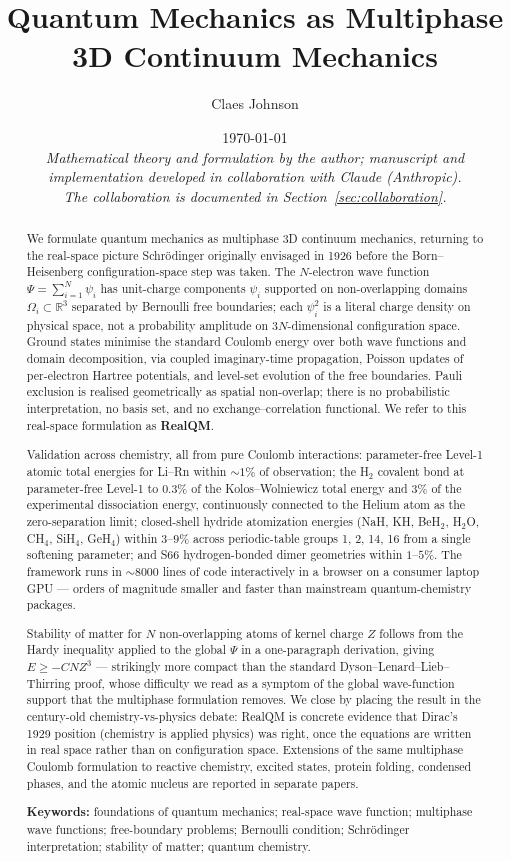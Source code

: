 \documentclass[11pt]{article}
\title{Quantum Mechanics as Multiphase 3D Continuum Mechanics}
\author[1]{Claes Johnson}
\affil[1]{KTH Royal Institute of Technology, Stockholm, Sweden \\
\texttt{claesjohnson@gmail.com}}
\date{\today \\[0.4em]
\small\textit{Mathematical theory and formulation by the author; manuscript and} \\
\small\textit{implementation developed in collaboration with Claude (Anthropic).} \\
\small\textit{The collaboration is documented in Section~\ref{sec:collaboration}.}}
\begin{document}
\maketitle

\begin{abstract}
We formulate quantum mechanics as multiphase 3D continuum mechanics, returning to the real-space picture Schr\"odinger originally envisaged in 1926 before the Born--Heisenberg configuration-space step was taken. The $N$-electron wave function $\Psi = \sum_{i=1}^{N} \psi_i$ has unit-charge components $\psi_i$ supported on non-overlapping domains $\Omega_i \subset \mathbb{R}^3$ separated by Bernoulli free boundaries; each $\psi_i^2$ is a literal charge density on physical space, not a probability amplitude on $3N$-dimensional configuration space. Ground states minimise the standard Coulomb energy over both wave functions and domain decomposition, via coupled imaginary-time propagation, Poisson updates of per-electron Hartree potentials, and level-set evolution of the free boundaries. Pauli exclusion is realised geometrically as spatial non-overlap; there is no probabilistic interpretation, no basis set, and no exchange--correlation functional. We refer to this real-space formulation as \textbf{RealQM}.

Validation across chemistry, all from pure Coulomb interactions: parameter-free Level-1 atomic total energies for Li--Rn within ${\sim}1\%$ of observation; the H$_2$ covalent bond at parameter-free Level-1 to $0.3\%$ of the Kolos--Wolniewicz total energy and $3\%$ of the experimental dissociation energy, continuously connected to the Helium atom as the zero-separation limit; closed-shell hydride atomization energies (NaH, KH, BeH$_2$, H$_2$O, CH$_4$, SiH$_4$, GeH$_4$) within $3$--$9\%$ across periodic-table groups 1, 2, 14, 16 from a single softening parameter; and S66 hydrogen-bonded dimer geometries within $1$--$5\%$. The framework runs in $\sim 8000$ lines of code interactively in a browser on a consumer laptop GPU --- orders of magnitude smaller and faster than mainstream quantum-chemistry packages.

Stability of matter for $N$ non-overlapping atoms of kernel charge $Z$ follows from the Hardy inequality applied to the global $\Psi$ in a one-paragraph derivation, giving $E \ge -C N Z^3$ --- strikingly more compact than the standard Dyson--Lenard--Lieb--Thirring proof, whose difficulty we read as a symptom of the global wave-function support that the multiphase formulation removes. We close by placing the result in the century-old chemistry-vs-physics debate: RealQM is concrete evidence that Dirac's 1929 position (chemistry is applied physics) was right, once the equations are written in real space rather than on configuration space. Extensions of the same multiphase Coulomb formulation to reactive chemistry, excited states, protein folding, condensed phases, and the atomic nucleus are reported in separate papers.

\medskip
\noindent \textbf{Keywords:} foundations of quantum mechanics; real-space wave function; multiphase wave functions; free-boundary problems; Bernoulli condition; Schr\"odinger interpretation; stability of matter; quantum chemistry.
\end{abstract}
\end{document}
